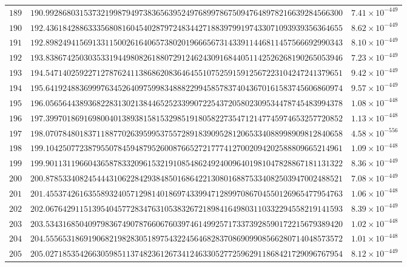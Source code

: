 \documentclass[12pt,reqno]{amsart}
\theoremstyle{remark}
\begin{document}
\begin{longtable}{clc}
$189$ & $190.9928680315373219987949738365639524976899786750947648978216639284566300$ & $7.41\times 10^{-449}$ \\
$190$ & $192.4361842886333568081604540287972483442718839799197433071093939356364655$ & $8.62\times 10^{-449}$ \\
$191$ & $192.8982494156913311500261640657380201966656731433911446811457566692990343$ & $8.10\times 10^{-449}$ \\
$192$ & $193.8386742503035331944980826188072912462430916844051142526268190265053946$ & $7.23\times 10^{-449}$ \\
$193$ & $194.5471402592271278762411386862083646455107525915912567223104247241379651$ & $9.42\times 10^{-449}$ \\
$194$ & $195.6419248836999763452640975998348882299458578374043670161583745606860974$ & $9.57\times 10^{-449}$ \\
$195$ & $196.0565644389368228313021384465252339907225437205802309534478745483994378$ & $1.08\times 10^{-448}$ \\
$196$ & $197.3997018691698004013893815815329851918058227354712147745974653257720852$ & $1.13\times 10^{-448}$ \\
$197$ & $198.0707848018371188770263959953755728918390952812065334088998909812840658$ & $4.58\times 10^{-556}$ \\
$198$ & $199.1042507723879550784594879526008766527217774127002094202588809665214961$ & $1.09\times 10^{-448}$ \\
$199$ & $199.9011311966043658783320961532191085486249240096401981047828867181131322$ & $8.36\times 10^{-449}$ \\
$200$ & $200.8785334082454443106228429384850168642213080168875334082503947002488521$ & $7.08\times 10^{-449}$ \\
$201$ & $201.4553742616355893240571298140186974339947128997086704550126965477954763$ & $1.06\times 10^{-448}$ \\
$202$ & $202.0676429115139540457728347631053832672189841649803110332294558219141593$ & $8.39\times 10^{-449}$ \\
$203$ & $203.5343168504097983674907876606760397461499257173373928590172215679389420$ & $1.02\times 10^{-448}$ \\
$204$ & $204.5556531869190682198283051897543224564682837086909908566280714048573572$ & $1.01\times 10^{-448}$ \\
$205$ & $205.0271853542663059851137482361267341246330527725962911868421729096767954$ & $8.12\times 10^{-449}$ \\

\end{longtable}
\end{document}
